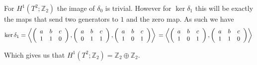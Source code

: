 \documentclass[10pt]{article}
\newcommand{\bb}[1]{\mathbb{#1}}
\theoremstyle{plain}
\theoremstyle{remark}
\begin{document}
For $H^1(T^2;\bb{Z}_2)$ the image of $\delta_0$ is trivial. However for $\ker\delta_1$
this will be exactly the maps that send two generators to $1$ and the zero
map. As such we have
\[
  \ker\delta_1 =
  \left\langle
    \left(
      \begin{array}{ccc}
        a & b & c\\
        1 & 1 & 0
      \end{array}
    \right),
    \left(
      \begin{array}{ccc}
        a & b & c\\
        0 & 1 & 1
      \end{array}
    \right),
    \left(
      \begin{array}{ccc}
        a & b & c\\
        1 & 0 & 1
      \end{array}
    \right)
  \right\rangle\\
  =
  \left\langle
    \left(
      \begin{array}{ccc}
        a & b & c\\
        1 & 0 & 1
      \end{array}
    \right),
    \left(
      \begin{array}{ccc}
        a & b & c\\
        1 & 1 & 0
      \end{array}
    \right)
  \right\rangle\\
\]

Which gives us that $H^1(T^2;\bb{Z}_2)=\bb{Z}_2\oplus\bb{Z}_2$.
\end{document}
